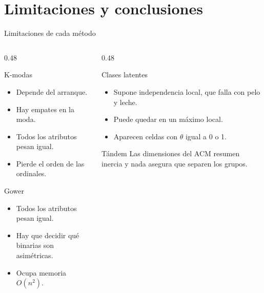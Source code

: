 \documentclass[aspectratio=169]{beamer}
\newenvironment{lista}
  {\begin{itemize}\setlength{\itemsep}{0pt}\setlength{\parskip}{0pt}}
  {\end{itemize}}
\begin{document}
\section{Limitaciones y conclusiones}

\begin{frame}{Limitaciones de cada método}
  \begin{columns}[T]
    \begin{column}{0.48\textwidth}
      \begin{alertblock}{K-modas}
        \footnotesize
        \begin{lista}
          \item Depende del arranque.
          \item Hay empates en la moda.
          \item Todos los atributos pesan igual.
          \item Pierde el orden de las ordinales.
        \end{lista}
      \end{alertblock}
      \begin{alertblock}{Gower}
        \footnotesize
        \begin{lista}
          \item Todos los atributos pesan igual.
          \item Hay que decidir qué binarias son asimétricas.
          \item Ocupa memoria $O(n^2)$.
        \end{lista}
      \end{alertblock}
    \end{column}
    \begin{column}{0.48\textwidth}
      \begin{alertblock}{Clases latentes}
        \footnotesize
        \begin{lista}
          \item Supone independencia local, que falla con pelo y leche.
          \item Puede quedar en un máximo local.
          \item Aparecen celdas con $\theta$ igual a 0 o 1.
        \end{lista}
      \end{alertblock}
      \begin{alertblock}{Tándem}
        \footnotesize Las dimensiones del ACM resumen inercia y nada
        asegura que separen los grupos.
      \end{alertblock}
    \end{column}
  \end{columns}
\end{frame}
\end{document}
